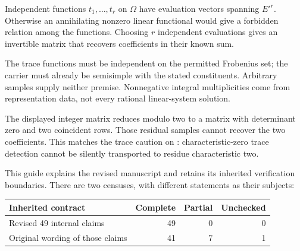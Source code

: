 
Independent functions $t_1,\ldots,t_r$ on $\Omega$ have evaluation vectors spanning $E'^r$. Otherwise an annihilating nonzero linear functional would give a forbidden relation among the functions. Choosing $r$ independent evaluations gives an invertible matrix that recovers coefficients in their known sum.

The trace functions must be independent on the permitted Frobenius set; the carrier must already be semisimple with the stated constituents. Arbitrary samples supply neither premise. Nonnegative integral multiplicities come from representation data, not every rational linear-system solution.

The displayed integer matrix reduces modulo two to a matrix with determinant zero and two coincident rows. Those residual samples cannot recover the two coefficients. This matches the trace caution on : characteristic-zero trace detection cannot be silently transported to residue characteristic two.


This guide explains the revised manuscript and retains its inherited verification boundaries. There are two censuses, with different statements as their subjects:

\begin{center}
\begin{tabular}{@{}lrrr@{}}\toprule
Inherited contract & Complete & Partial & Unchecked\\\midrule
Revised 49 internal claims & 49 & 0 & 0\\
Original wording of those claims & 41 & 7 & 1\\\bottomrule
\end{tabular}
\end{center}

